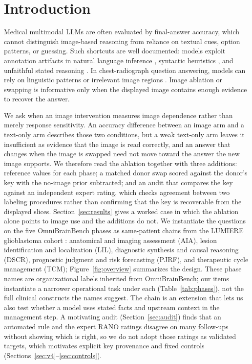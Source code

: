 \documentclass[conference]{IEEEtran}
\begin{document}
\section{Introduction}
\label{sec:introduction}

Medical multimodal LLMs are often evaluated by final-answer accuracy, which cannot distinguish image-based reasoning from reliance on textual cues, option patterns, or guessing. Such shortcuts are well documented: models exploit annotation artifacts in natural language inference \citep{gururangan2018annotation}, syntactic heuristics \citep{mccoy2019right}, and unfaithful stated reasoning \citep{turpin2023language}. In chest-radiograph question answering, models can rely on linguistic patterns or irrelevant image regions \citep{nguyen2025localizing}. Image ablation or swapping is informative only when the displayed image contains enough evidence to recover the answer.

We ask when an image intervention measures image dependence rather than merely response sensitivity. An accuracy difference between an image arm and a text-only arm describes those two conditions, but a weak text-only arm leaves it insufficient as evidence that the image is read correctly, and an answer that changes when the image is swapped need not move toward the answer the new image supports. We therefore read the ablation together with three additions: reference values for each phase; a matched donor swap scored against the donor's key with the no-image prior subtracted; and an audit that compares the key against an independent expert rating, which checks agreement between two labeling procedures rather than confirming that the key is recoverable from the displayed slices. Section~\ref{sec:results} gives a worked case in which the ablation alone points to image use and the additions do not. We instantiate the questions on the five OmniBrainBench phases \citep{peng2026omnibrainbench} as same-patient chains from the LUMIERE glioblastoma cohort \citep{suter2022lumiere}: anatomical and imaging assessment (AIA), lesion identification and localization (LIL), diagnostic synthesis and causal reasoning (DSCR), prognostic judgment and risk forecasting (PJRF), and therapeutic cycle management (TCM); Figure~\ref{fig:overview} summarizes the design. These phase names are organizational labels inherited from OmniBrainBench; our items instantiate a narrower operational task under each (Table~\ref{tab:phases}), not the full clinical constructs the names suggest. The chain is an extension that lets us also test whether a model uses stated facts and upstream context in the management step. A motivating audit (Section~\ref{sec:audit}) finds that an automated rule and the expert RANO ratings disagree on many follow-ups without showing which is right, so we do not adopt those ratings as validated targets, which motivates explicit key provenance and fixed controls (Sections~\ref{sec:v4}--\ref{sec:controls}).
\end{document}
